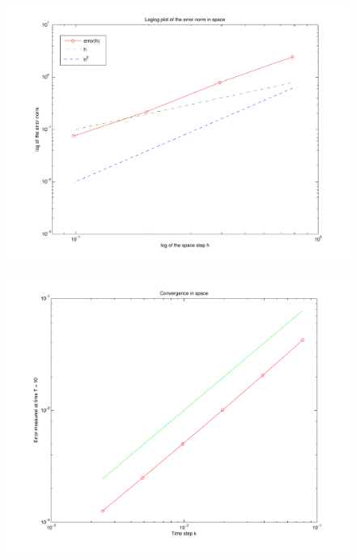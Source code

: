 \documentclass[screen]{beamer}
\begin{document}
\begin{frame}

\begin{figure}[htb]
\includegraphics[width=1\textwidth]{conv_space_IMEX_T50.pdf}
\end{figure}

\end{frame}

\begin{frame}

\begin{figure}[htb]
\includegraphics[width=1\textwidth]{conv_time_IMEXT10.pdf}
\end{figure}

\end{frame}
\end{document}

